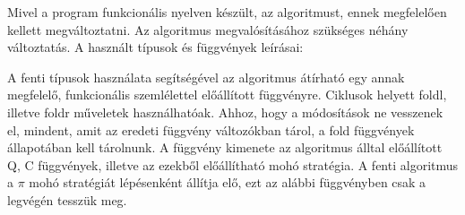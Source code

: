 \documentclass[12pt]{article}
\begin{document}
Mivel a program funkcionális nyelven készült, az algoritmust, ennek megfelelően kellett megváltoztatni.
Az algoritmus megvalósításához szükséges néhány változtatás. A használt típusok és függvények leírásai:

\vspace{1cm}
\noindent{}
\vspace{1.5em}

A fenti típusok használata segítségével az algoritmus átírható egy annak megfelelő, funkcionális szemlélettel előállított függvényre. Ciklusok helyett foldl, illetve foldr műveletek használhatóak. Ahhoz, hogy a módosítások ne vesszenek el, mindent, amit az eredeti függvény változókban tárol, a fold függvények állapotában kell tárolnunk. A függvény kimenete az algoritmus álltal előállított Q, C függvények, illetve az ezekből előállítható mohó stratégia. A fenti algoritmus a $\pi$ mohó stratégiát lépésenként állítja elő, ezt az alábbi függvényben csak a legvégén tesszük meg.
\end{document}
